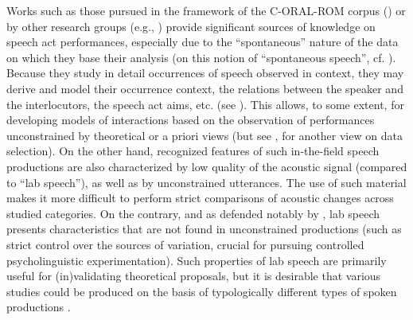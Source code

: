 \documentclass[output=paper]{LSP/langsci}
\begin{document}
Works such as those pursued in the framework of the C-ORAL-ROM corpus (\citealt{Cresti2000,Moneglia2011,Raso2012}) or by other research groups (e.g., \citealt{fontaney1991question,culpeper2003impoliteness,Moraes12}) provide significant sources of knowledge on speech act performances, especially due to the ``spontaneous'' nature of the data on which they base their analysis (on this notion of ``spontaneous speech'', cf. \citealt{blanche1999franccais}). 
Because they study in detail occurrences of speech observed in context, they may derive and model their occurrence context, the relations between the speaker and the interlocutors, the speech act aims, etc. (see \citealt{kohler2004pragmatic}).
This allows, to some extent, for developing models of interactions based on the observation of performances unconstrained by theoretical or a priori views (but see \citealt{Wagner.2015}, for another view on data selection).  
On the other hand, recognized features of such in-the-field speech productions are also characterized by low quality of the acoustic signal (compared to ``lab speech''), as well as by unconstrained utterances. 
The use of such material makes it more difficult to perform strict comparisons of acoustic changes across studied categories. 
On the contrary, and as defended notably by \citet{Xu2010}, lab speech presents characteristics that are not found in unconstrained productions (such as strict control over the sources of variation, crucial for pursuing controlled psycholinguistic experimentation). 
Such properties of lab speech are primarily useful for (in)validating theoretical proposals, but it is desirable that various studies could be produced on the basis of typologically different types of spoken productions \citep{Wagner.2015}.
\end{document}
